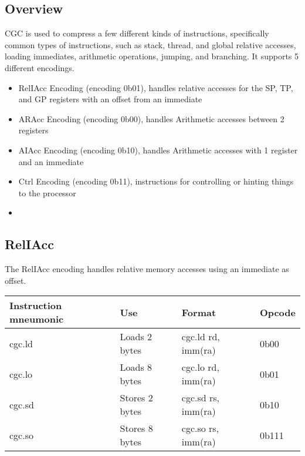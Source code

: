 \documentclass[6pt]{article}
\begin{document}
\subsection{Overview}
CGC is used to compress a few different kinds of instructions, specifically common types of instructions, such as stack, thread, and global relative accesses, loading immediates, arithmetic operations, jumping, and branching. It supports 5 different encodings.
\begin{itemize}
    \item RelIAcc Encoding (encoding 0b01), handles relative accesses for the SP, TP, and GP registers with an offset from an immediate
    \item ARAcc Encoding (encoding 0b00), handles Arithmetic accesses between 2 registers
    \item AIAcc Encoding (encoding 0b10), handles Arithmetic accesses with 1 register and an immediate
    \item Ctrl Encoding (encoding 0b11), instructions for controlling or hinting things to the processor
    \item 
\end{itemize}
\subsection{RelIAcc}
The RelIAcc encoding handles relative memory accesses using an immediate as offset.

\begin{center}
\begin{tabularx}{\textwidth}{ |>{\raggedright\arraybackslash}X|>{\raggedright\arraybackslash}X|>{\raggedright\arraybackslash}X|>{\raggedright\arraybackslash}X| }
    \hline
    Instruction mneumonic & Use & Format & Opcode \\
    \hline
    cgc.ld & Loads 2 bytes & cgc.ld rd, imm(ra) & 0b00 \\
    \hline
    cgc.lo & Loads 8 bytes & cgc.lo rd, imm(ra) & 0b01 \\
    \hline
    cgc.sd & Stores 2 bytes & cgc.sd rs, imm(ra) & 0b10 \\
    \hline
    cgc.so & Stores 8 bytes & cgc.so rs, imm(ra) & 0b111 \\
    \hline
\end{tabularx}
\end{center}
\end{document}
